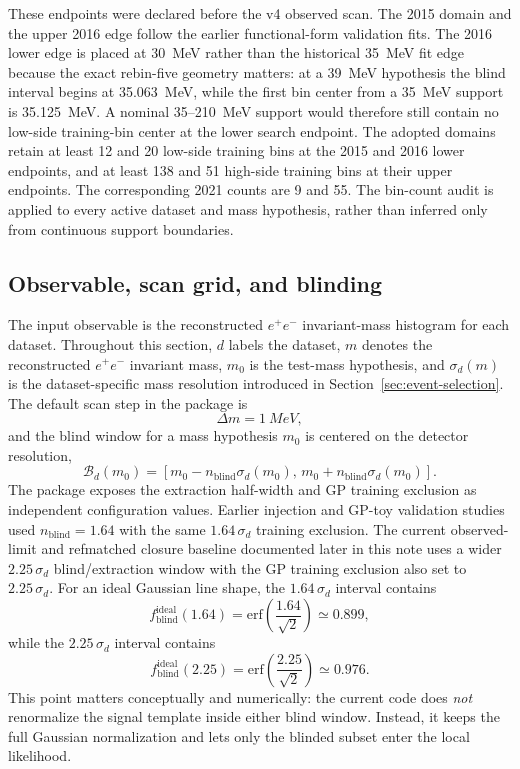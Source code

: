 These endpoints were declared before the v4 observed scan. The 2015 domain and the
upper 2016 edge follow the earlier functional-form validation fits. The 2016 lower
edge is placed at 30~MeV rather than the historical 35~MeV fit edge because the exact
rebin-five geometry matters: at a 39~MeV hypothesis the blind interval begins at
35.063~MeV, while the first bin center from a 35~MeV support is 35.125~MeV. A nominal
35--210~MeV support would therefore still contain no low-side training-bin center at
the lower search endpoint. The adopted domains retain at least 12 and 20 low-side
training bins at the 2015 and 2016 lower endpoints, and at least 138 and 51 high-side
training bins at their upper endpoints. The corresponding 2021 counts are 9 and 55.
The bin-count audit is applied to every active dataset and mass hypothesis, rather
than inferred only from continuous support boundaries.

\subsection{Observable, scan grid, and blinding}

The input observable is the reconstructed $e^+e^-$ invariant-mass histogram for each
dataset. Throughout this section, $d$ labels the dataset, $m$ denotes the reconstructed
$e^+e^-$ invariant mass, $m_0$ is the test-mass hypothesis, and $\sigma_d(m)$ is the
dataset-specific mass resolution introduced in
Section~\ref{sec:event-selection}. The default scan step in the package is
\begin{equation}
\Delta m = \SI{1}{MeV},
\end{equation}
and the blind window for a mass hypothesis $m_0$ is centered on the detector
resolution,
\begin{equation}
\mathcal{B}_d(m_0) =
\left[m_0 - n_{\mathrm{blind}}\sigma_d(m_0),\,
      m_0 + n_{\mathrm{blind}}\sigma_d(m_0)\right].
\end{equation}
The package exposes the extraction half-width and GP training exclusion as independent
configuration values. Earlier injection and GP-toy validation studies used
$n_{\mathrm{blind}}=1.64$ with the same $1.64\,\sigma_d$ training exclusion. The current
observed-limit and refmatched closure baseline documented later in this note uses a
wider $2.25\,\sigma_d$ blind/extraction window with the GP training exclusion also set
to $2.25\,\sigma_d$. For an ideal Gaussian line shape, the $1.64\,\sigma_d$ interval
contains
\begin{equation}
f_{\mathrm{blind}}^{\mathrm{ideal}}(1.64)
= \mathrm{erf}\!\left(\frac{1.64}{\sqrt{2}}\right)
\simeq 0.899,
\end{equation}
while the $2.25\,\sigma_d$ interval contains
\begin{equation}
f_{\mathrm{blind}}^{\mathrm{ideal}}(2.25)
= \mathrm{erf}\!\left(\frac{2.25}{\sqrt{2}}\right)
\simeq 0.976.
\end{equation}
This point matters conceptually and numerically: the current code does
\emph{not} renormalize the signal template inside either blind window. Instead, it
keeps the full Gaussian normalization and lets only the blinded subset enter the local
likelihood.

